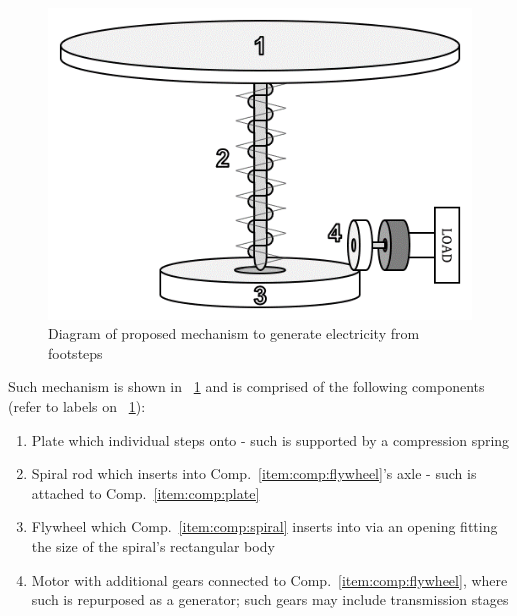 \documentclass[conference]{ieeetran}
\newcommand{\figref}[1]{\figurename~\ref{#1}}
\newcommand{\compref}[1]{Comp.~\ref{#1}}
\begin{document}
\begin{figure}[ht]
    \centering
    \caption{Diagram of proposed mechanism to generate electricity from footsteps}
    \label{fig:mech_wlabel}
    \includegraphics[width=\linewidth]{mech_wlabel.png}
\end{figure}

Such mechanism is shown in \figref{fig:mech_wlabel} and is comprised of the following components (refer to labels on \figref{fig:mech_wlabel}):
\begin{enumerate}
    \item\label{item:comp:plate} Plate which individual steps onto - such is supported by a compression spring
    \item\label{item:comp:spiral} Spiral rod which inserts into \compref{item:comp:flywheel}'s axle - such is attached to \compref{item:comp:plate}
    \item\label{item:comp:flywheel} Flywheel which \compref{item:comp:spiral} inserts into via an opening fitting the size of the spiral's rectangular body
    \item\label{item:comp:motor} Motor with additional gears connected to \compref{item:comp:flywheel}, where such is repurposed as a generator; such gears may include transmission stages
\end{enumerate}
\end{document}
